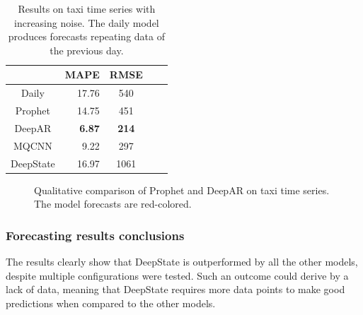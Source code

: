 \documentclass[a4paper, 12pt]{article} %
\newcommand{\ra}[1]{\renewcommand{\arraystretch}{#1}}
\begin{document}
	\begin{table}\centering 
		\ra{1.3}
		\begin{tabular}{@{}crcrc@{}}
			\midrule
			& MAPE & RMSE\\
			\midrule
			Daily & 17.76 & 540\\
			Prophet & 14.75 & 451\\
			DeepAR & \textbf{6.87} & \textbf{214}\\
			MQCNN & 9.22 & 297\\
			DeepState & 16.97 & 1061\\
			\bottomrule
		\end{tabular}
		\caption{Results on taxi time series with increasing noise. The daily model produces forecasts repeating data of the previous day. } \label{table:results_forecasting_taxi}
	\end{table}
	
	\begin{figure}\centering
		
		\caption{Qualitative comparison of Prophet and DeepAR on taxi time series. The model forecasts are red-colored.}
		\label{fig:results_forecasting_taxi_prophet_deepar}
	\end{figure}
	
	\clearpage
	\subsubsection{Forecasting results conclusions}
	The results clearly show that DeepState is outperformed by all the other models, despite multiple configurations were tested. Such an outcome could derive by a lack of data, meaning that DeepState requires more data points to make good predictions when compared to the other models.
	
\end{document}
